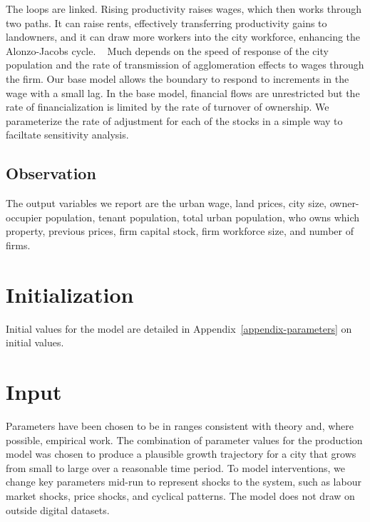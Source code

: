  
The loops are linked. Rising productivity raises wages, which then works through two paths. It can raise rents, effectively transferring productivity gains to landowners, and it can draw more workers into the city workforce, enhancing the \Gls{Alonzo-Jacobs cycle}. 
\
Much depends on the speed of response of the city population and the rate of transmission of agglomeration effects to wages through the firm. Our base model allows the boundary to respond to increments in the wage with a small lag. In the base model, financial flows are unrestricted but the rate of financialization is limited by the rate of turnover of ownership. We parameterize the rate of adjustment for each of the stocks in a simple way to faciltate sensitivity analysis.

\subsection{Observation}
The output variables we report are the urban wage, land prices, city size, owner-occupier population, tenant population, total urban population, who owns which property, previous prices, firm capital stock, firm workforce size, and number of firms.

\section{Initialization}
Initial values for the model are detailed in Appendix~\ref{appendix-parameters} on initial values.

\section{Input}
Parameters have been chosen to be in ranges consistent with theory and, where possible, empirical work. The combination of parameter values for the production model was chosen to produce a plausible growth trajectory for a city that grows from small to large over a reasonable time period. To model interventions, we change key parameters mid-run to represent shocks to the system, such as labour market shocks, price shocks, and cyclical patterns. %
The model does not draw on outside digital datasets. 

